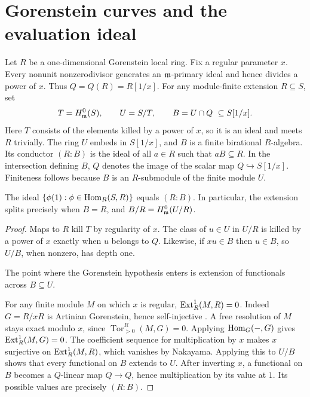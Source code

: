 \section{Gorenstein curves and the evaluation ideal}\label{scalar}
Let $R$ be a one-dimensional Gorenstein local ring. Fix a regular parameter $x$. Every nonunit nonzerodivisor generates an $\mathfrak m$-primary ideal and hence divides a power of $x$. Thus $Q=Q(R)=R[1/x]$. For any module-finite extension $R\subseteq S$, set
\[
 T=H^0_{\mathfrak m}(S),\qquad U=S/T,\qquad B=U\cap Q\ \subseteq S[1/x].
\]
Here $T$ consists of the elements killed by a power of $x$, so it is an ideal and meets $R$ trivially. The ring $U$ embeds in $S[1/x]$, and $B$ is a finite birational $R$-algebra. Its conductor $(R:B)$ is the ideal of all $a\in R$ such that $aB\subseteq R$.
In the intersection defining $B$, $Q$ denotes the image of the
scalar map $Q\hookrightarrow S[1/x]$.  Finiteness follows
because $B$ is an $R$-submodule of the finite module $U$.
\begin{proposition}\label{eval}
The ideal $\{\phi(1):\phi\in\operatorname{Hom}_R(S,R)\}$ equals $(R:B)$. In particular, the extension splits precisely when $B=R$, and $B/R=H^0_{\mathfrak m}(U/R)$.
\end{proposition}
\begin{proof}
Maps to $R$ kill $T$ by regularity of $x$. The class of $u\in U$ in $U/R$ is killed by a power of $x$ exactly when $u$ belongs to $Q$. Likewise, if $x u\in B$ then $u\in B$, so $U/B$, when nonzero, has depth one.

The point where the Gorenstein hypothesis enters is extension of
functionals across $B\subseteq U$.

For any finite module $M$ on which $x$ is regular, $\operatorname{Ext}^1_R(M,R)=0$. Indeed $G=R/xR$ is Artinian Gorenstein, hence self-injective \cite{BH}. A free resolution of $M$ stays exact modulo $x$, since $\operatorname{Tor}_{>0}^R(M,G)=0$. Applying $\operatorname{Hom}_G(-,G)$ gives $\operatorname{Ext}^1_R(M,G)=0$. The coefficient sequence for multiplication by $x$ makes $x$ surjective on $\operatorname{Ext}^1_R(M,R)$, which vanishes by Nakayama. Applying this to $U/B$ shows that every functional on $B$ extends to $U$. After inverting $x$, a functional on $B$ becomes a $Q$-linear map $Q\to Q$, hence multiplication by its value at $1$. Its possible values are precisely $(R:B)$.
\end{proof}

